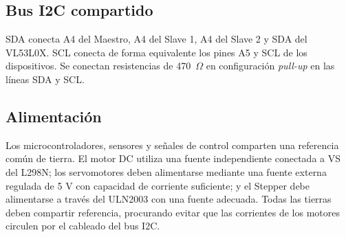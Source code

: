 \subsection{Bus I2C compartido}
SDA conecta A4 del Maestro, A4 del Slave 1, A4 del Slave 2 y SDA del VL53L0X. SCL conecta de forma equivalente los pines A5 y SCL de los dispositivos. Se conectan resistencias de 470~\(\Omega\) en configuración \textit{pull-up} en las líneas SDA y SCL.

\subsection{Alimentación}
Los microcontroladores, sensores y señales de control comparten una referencia común de tierra. El motor DC utiliza una fuente independiente conectada a VS del L298N; los servomotores deben alimentarse mediante una fuente externa regulada de 5 V con capacidad de corriente suficiente; y el Stepper debe alimentarse a través del ULN2003 con una fuente adecuada. Todas las tierras deben compartir referencia, procurando evitar que las corrientes de los motores circulen por el cableado del bus I2C.
